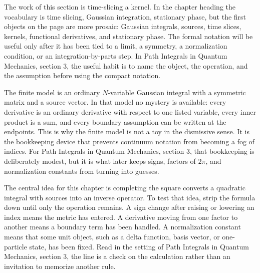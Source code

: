 











The work of this section is time-slicing a kernel.  In the chapter heading the vocabulary is time slicing, Gaussian integration, stationary phase, but the first objects on the page are more prosaic: Gaussian integrals, sources, time slices, kernels, functional derivatives, and stationary phase.  The formal notation will be useful only after it has been tied to a limit, a symmetry, a normalization condition, or an integration-by-parts step.  In Path Integrals in Quantum Mechanics, section 3, the useful habit is to name the object, the operation, and the assumption before using the compact notation.

The finite model is an ordinary \(N\)-variable Gaussian integral with a symmetric matrix and a source vector.  In that model no mystery is available: every derivative is an ordinary derivative with respect to one listed variable, every inner product is a sum, and every boundary assumption can be written at the endpoints.  This is why the finite model is not a toy in the dismissive sense.  It is the bookkeeping device that prevents continuum notation from becoming a fog of indices.  For Path Integrals in Quantum Mechanics, section 3, that bookkeeping is deliberately modest, but it is what later keeps signs, factors of \(2\pi\), and normalization constants from turning into guesses.

The central idea for this chapter is completing the square converts a quadratic integral with sources into an inverse operator.  To test that idea, strip the formula down until only the operation remains.  A sign change after raising or lowering an index means the metric has entered.  A derivative moving from one factor to another means a boundary term has been handled.  A normalization constant means that some unit object, such as a delta function, basis vector, or one-particle state, has been fixed.  Read in the setting of Path Integrals in Quantum Mechanics, section 3, the line is a check on the calculation rather than an invitation to memorize another rule.

